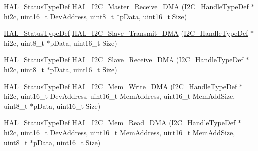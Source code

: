 \begin{DoxyCompactItemize}
\item 
\hyperlink{stm32f4xx__hal__def_8h_a63c0679d1cb8b8c684fbb0632743478f}{H\+A\+L\+\_\+\+Status\+Type\+Def} \hyperlink{group___i2_c___exported___functions___group2_ga299f5e16a92826b9856c60265bc22cf2}{H\+A\+L\+\_\+\+I2\+C\+\_\+\+Master\+\_\+\+Receive\+\_\+\+D\+MA} (\hyperlink{group___i2_c__handle___structure__definition_ga68e9f45c2fd2161fb827ccdeabb55ea5}{I2\+C\+\_\+\+Handle\+Type\+Def} $\ast$hi2c, uint16\+\_\+t Dev\+Address, uint8\+\_\+t $\ast$p\+Data, uint16\+\_\+t Size)
\item 
\hyperlink{stm32f4xx__hal__def_8h_a63c0679d1cb8b8c684fbb0632743478f}{H\+A\+L\+\_\+\+Status\+Type\+Def} \hyperlink{group___i2_c___exported___functions___group2_ga59e69e0da57150f980deea0d235f0397}{H\+A\+L\+\_\+\+I2\+C\+\_\+\+Slave\+\_\+\+Transmit\+\_\+\+D\+MA} (\hyperlink{group___i2_c__handle___structure__definition_ga68e9f45c2fd2161fb827ccdeabb55ea5}{I2\+C\+\_\+\+Handle\+Type\+Def} $\ast$hi2c, uint8\+\_\+t $\ast$p\+Data, uint16\+\_\+t Size)
\item 
\hyperlink{stm32f4xx__hal__def_8h_a63c0679d1cb8b8c684fbb0632743478f}{H\+A\+L\+\_\+\+Status\+Type\+Def} \hyperlink{group___i2_c___exported___functions___group2_gad9dd42a10e5c108e30e6546cb64639c2}{H\+A\+L\+\_\+\+I2\+C\+\_\+\+Slave\+\_\+\+Receive\+\_\+\+D\+MA} (\hyperlink{group___i2_c__handle___structure__definition_ga68e9f45c2fd2161fb827ccdeabb55ea5}{I2\+C\+\_\+\+Handle\+Type\+Def} $\ast$hi2c, uint8\+\_\+t $\ast$p\+Data, uint16\+\_\+t Size)
\item 
\hyperlink{stm32f4xx__hal__def_8h_a63c0679d1cb8b8c684fbb0632743478f}{H\+A\+L\+\_\+\+Status\+Type\+Def} \hyperlink{group___i2_c___exported___functions___group2_ga12a2a86be393359534f630cdd090d8bb}{H\+A\+L\+\_\+\+I2\+C\+\_\+\+Mem\+\_\+\+Write\+\_\+\+D\+MA} (\hyperlink{group___i2_c__handle___structure__definition_ga68e9f45c2fd2161fb827ccdeabb55ea5}{I2\+C\+\_\+\+Handle\+Type\+Def} $\ast$hi2c, uint16\+\_\+t Dev\+Address, uint16\+\_\+t Mem\+Address, uint16\+\_\+t Mem\+Add\+Size, uint8\+\_\+t $\ast$p\+Data, uint16\+\_\+t Size)
\item 
\hyperlink{stm32f4xx__hal__def_8h_a63c0679d1cb8b8c684fbb0632743478f}{H\+A\+L\+\_\+\+Status\+Type\+Def} \hyperlink{group___i2_c___exported___functions___group2_gab25b99552182d2486d8eb441fffdd0a4}{H\+A\+L\+\_\+\+I2\+C\+\_\+\+Mem\+\_\+\+Read\+\_\+\+D\+MA} (\hyperlink{group___i2_c__handle___structure__definition_ga68e9f45c2fd2161fb827ccdeabb55ea5}{I2\+C\+\_\+\+Handle\+Type\+Def} $\ast$hi2c, uint16\+\_\+t Dev\+Address, uint16\+\_\+t Mem\+Address, uint16\+\_\+t Mem\+Add\+Size, uint8\+\_\+t $\ast$p\+Data, uint16\+\_\+t Size)

\end{DoxyCompactItemize}
